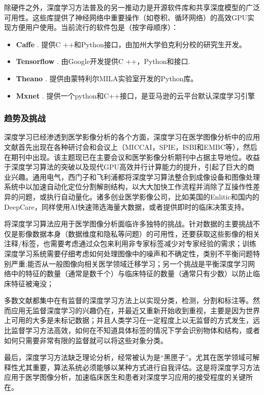 除硬件之外，深度学习方法普及的另一推动力是开源软件库和共享深度模型的广泛可用性。这些库提供了神经网络中重要操作（如卷积、循环网络）的高效GPU实现方便用户使用。当前流行的软件包是（按字母顺序）：
\begin{itemize}
 \item {\bf Caffe} \citep{Jia2014}. 提供C ++和Python接口，由加州大学伯克利分校的研究生开发。
 \item {\bf Tensorflow} \citep{Abadi2016TensorFlow}. 由Google开发提供C ++，Python和接口.
 \item {\bf Theano} \citep{AlRfou2016Theano}. 提供由蒙特利尔MILA实验室开发的Python库。
 \item {\bf Mxnet} \citep{Chen2015mxnet}. 提供一个python和C++接口，是亚马逊的云平台默认深度学习引擎  
\end{itemize}
 
\subsubsection{趋势及挑战}

深度学习已经渗透到医学影像分析的各个方面，深度学习在医学图像分析中的应用文献首先出现在各种研讨会和会议上（MICCAI，SPIE，ISBI和EMBC等），然后在期刊中出现。该主题现已在主要会议和医学影像分析期刊中占据主导地位。收益于深度学习算法的突破以及现代GPU高效并行计算能力的提升，引起了巨大的商业兴趣。通用电气，西门子和飞利浦都将深度学习算法整合到成像设备和图像处理系统中以加速自动化定位分割解剖结构，以大大加快工作流程并消除了互操作性差异的问题，或执行自动量化。诸多创业医学影像公司，比如美国的Enlitic和国内的DeepCare，同样使用AI快速筛选海量大数据，或者提供即时的临床决策支持。

将深度学习算法应用于医学图像分析面临许多独特的挑战。针对数据的主要挑战不仅是影像数据本身（数据维度和隐私等问题）的可用性，还要获取这些影像的相关注释/标签，也需要考虑通过众包来利用非专家标签减少对专家经验的需求；训练深度学习系统需要仔细考虑如何处理图像中的噪声和不确定性，类别不平衡问题特别严重;能否从一般图像向相关医学领域迁移学习；另一个挑战是平衡深度学习网络中的特征的数量（通常是数千个）与临床特征的数量（通常只有少数）以防止临床特征被淹没； 

多数文献都集中在有监督的深度学习方法上以实现分类，检测，分割和标注等。然而应用无监督深度学习的兴趣仍在，并最近又重新开始收到重视，主要是因为世界上可用的大多是未标记数据；并且人类学习在一定程度上以无监督的方式发生，远比监督学习方法高效，如何在不知道具体标签的情况下学会识别物体和结构，或者如何只需要非常有限的监督就可以将这些对象分类。

最后，深度学习方法缺乏理论分析，经常被认为是“黑匣子”。尤其在医学领域可解释性尤其重要，算法系统必须能够以某种方式进行自我评估。这是将深度学习方法应用于医学图像分析，加速临床医生和患者对深度学习应用的接受程度的关键所在。

